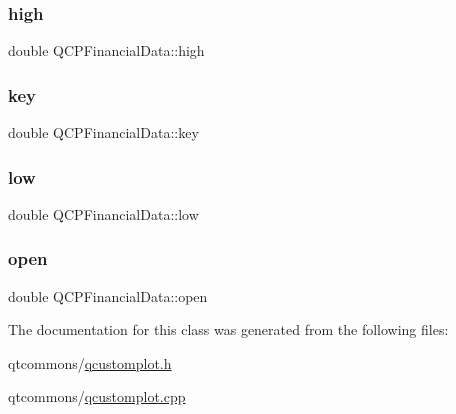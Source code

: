 \subsubsection{\texorpdfstring{high}{high}}
{\footnotesize\ttfamily double Q\+C\+P\+Financial\+Data\+::high}

\mbox{\label{class_q_c_p_financial_data_a18bc92126f28c214b05b0161e5f5958b}} 
\subsubsection{\texorpdfstring{key}{key}}
{\footnotesize\ttfamily double Q\+C\+P\+Financial\+Data\+::key}

\mbox{\label{class_q_c_p_financial_data_aecce0fb45a115e3f3a25eea78491ac16}} 
\subsubsection{\texorpdfstring{low}{low}}
{\footnotesize\ttfamily double Q\+C\+P\+Financial\+Data\+::low}

\mbox{\label{class_q_c_p_financial_data_a3059e1e1fbcb9fd243fde0450f238032}} 
\subsubsection{\texorpdfstring{open}{open}}
{\footnotesize\ttfamily double Q\+C\+P\+Financial\+Data\+::open}



The documentation for this class was generated from the following files\+:\begin{DoxyCompactItemize}
\item 
qtcommons/\mbox{\hyperlink{qcustomplot_8h}{qcustomplot.\+h}}\item 
qtcommons/\mbox{\hyperlink{qcustomplot_8cpp}{qcustomplot.\+cpp}}\end{DoxyCompactItemize}
